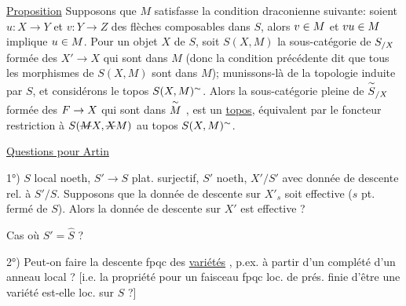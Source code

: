 \uline{Proposition} \quad Supposons que $M$ satisfasse la condition draconienne suivante: soient $u:X\to Y$ et $v:Y\to Z$ des flèches composables dans $S$,  alors $v\in M$ et $vu\in M$ implique $u\in M$. Pour un objet $X$ de $S$, soit $S(X,M)$ la sous-catégorie de $S_{/X}$  formée des $X'\to X$ qui sont dans $M$ (donc la condition précédente dit que tous les morphismes de $S(X,M)$ sont dans $M$); munissons-là de la topologie induite par $S$, et considérons le topos $S(X,M)^{\sim}$. Alors 
 la sous-catégorie pleine de $\overset{\sim}{S}_{/X}$ formée des $F\to X$ qui sont dans $\overset{\sim}{M}$ , est  un \uline{topos}, équivalent par le foncteur restriction à $S(\deleted{M}X,\deleted{X}M)$ au topos $S(X,M)^{\sim}$.


\uline{Questions pour Artin}

1°) $S$  local   noeth, $S'\to S$  plat. surjectif, $S'$ noeth, $X'/S'$  avec donnée de descente rel. à $S'/S$. Supposons que la donnée de descente sur $X'_s$ soit effective ($s$ pt. fermé de $S$). Alors la donnée de descente sur $X'$ est effective ?

Cas où $S'=\widehat{S}$ ?

2°) Peut-on faire la descente fpqc des \uline{variétés} , p.ex. à partir d'un complété d'un anneau local ? [i.e. la propriété pour un faisceau fpqc loc. de prés. finie d'être une variété est-elle loc.  sur $S$ ?]

